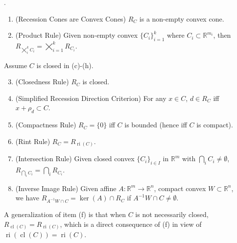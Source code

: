 \begin{prop}.
	\label{prop:013-yoga-recession}
	\begin{enumerate}[label=(\alph*)]
		\item (Recession Cones are Convex Cones) $R_C$ is a non-empty convex cone.
		\item (Product Rule) Given non-empty convex $\{C_i\}_{i=1}^k$ where $C_i\subset \mathbb{R}^{m_i}$, then $R_{\bigtimes_i^kC_i}=\bigtimes_{i=1}^kR_{C_i}$.
	\end{enumerate}
	Assume $C$ is closed in (c)-(h).
	\begin{enumerate}[label=(\alph*)]
		\setcounter{enumi}{2}
		\item (Closedness Rule) $R_C$ is closed.
		\item (Simplified Recession Direction Criterion) For any $x\in C$, $d\in R_C$ iff $x+\rho_d\subset C$.
		\item (Compactness Rule) $R_C=\{0\}$ iff $C$ is bounded (hence iff $C$ is compact).
		\item (Rint Rule) $R_C=R_{\operatorname{ri}(C)}$.
		\item (Intersection Rule) Given closed convex $\{C_i\}_{i\in I}$ in $\mathbb{R}^m$ with $\bigcap_i{C_i}\neq\emptyset$, $R_{\bigcap_iC_i}=\bigcap_iR_{C_i}$.
		\item (Inverse Image Rule) Given affine $A:\mathbb{R}^m\to \mathbb{R}^n$, compact convex $W\subset \mathbb{R}^n$,\\we have $R_{A^{-1}W\cap C}=\operatorname{ker}(A)\cap R_C$ if $A^{-1}W\cap C\neq\emptyset$.
	\end{enumerate}
\end{prop}

\begin{rmrk}
	A generalization of item (f) is that when $C$ is not necessarily closed, $R_{\operatorname{cl}(C)}=R_{\operatorname{ri}(C)}$, which is a direct consequence of (f) in view of $\operatorname{ri}(\operatorname{cl}(C))=\operatorname{ri}(C)$.
\end{rmrk}

